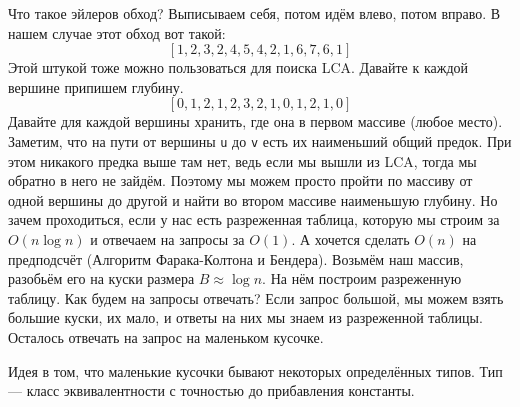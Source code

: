\documentclass{article}
\newcommand{\pseudo}{PseudoLexer.py:PseudoLexer -x}
\newcommand{\pseudocode}[1]{\texttt{#1}}
\begin{document}
    Что такое эйлеров обход? Выписываем себя, потом идём влево, потом вправо. В нашем случае этот обход вот такой:
    $$
    [1,2,3,2,4,5,4,2,1,6,7,6,1]
    $$
    Этой штукой тоже можно пользоваться для поиска LCA. Давайте к каждой вершине припишем глубину.
    $$
    [0,1,2,1,2,3,2,1,0,1,2,1,0]
    $$
    Давайте для каждой вершины хранить, где она в первом массиве (любое место). Заметим, что на пути от вершины \pseudocode{u} до \pseudocode{v} есть их наименьший общий предок. При этом никакого предка выше там нет, ведь если мы вышли из LCA, тогда мы обратно в него не зайдём. Поэтому мы можем просто пройти по массиву от одной вершины до другой и найти во втором массиве наименьшую глубину. Но зачем проходиться, если у нас есть разреженная таблица, которую мы строим за $O(n\log n)$ и отвечаем на запросы за $O(1)$. А хочется сделать $O(n)$ на предподсчёт (Алгоритм Фарака-Колтона и Бендера). Возьмём наш массив, разобьём его на куски размера $B\approx\log n$. На нём построим разреженную таблицу. Как будем на запросы отвечать? Если запрос большой, мы можем взять большие куски, их мало, и ответы на них мы знаем из разреженной таблицы. Осталось отвечать на запрос на маленьком кусочке.
    \begin{figure}[H]
    \end{figure}\noindent{}
    Идея в том, что маленькие кусочки бывают некоторых определённых типов. Тип --- класс эквивалентности с точностью до прибавления константы.
\end{document}
